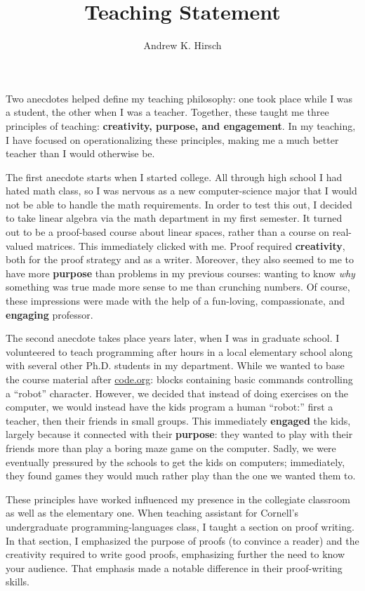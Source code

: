 \documentclass{article}
\author{Andrew K. Hirsch}
\title{Teaching Statement}
\date{}
\theoremstyle{definition}
\begin{document}
\maketitle

Two anecdotes helped define my teaching philosophy: one took place while I was a student, the other when I was a teacher.
Together, these taught me three principles of teaching: \textbf{creativity, purpose, and engagement}.
In my teaching, I have focused on operationalizing these principles, making me a much better teacher than I would otherwise be.

The first anecdote starts when I started college.
All through high school I had hated math class, so I was nervous as a new computer-science major that I would not be able to handle the math requirements.
In order to test this out, I decided to take linear algebra via the math department in my first semester.
It turned out to be a proof-based course about linear spaces, rather than a course on real-valued matrices.
This immediately clicked with me.
Proof required \textbf{creativity}, both for the proof strategy and as a writer.
Moreover, they also seemed to me to have more \textbf{purpose} than problems in my previous courses: wanting to know \emph{why} something was true made more sense to me than crunching numbers.
Of course, these impressions were made with the help of a fun-loving, compassionate, and \textbf{engaging} professor.

The second anecdote takes place years later, when I was in graduate school.
I volunteered to teach programming after hours in a local elementary school along with several other Ph.D. students in my department.
While we wanted to base the course material after \href{https://www.code.org}{code.org}: blocks containing basic commands controlling a ``robot'' character.
However, we decided that instead of doing exercises on the computer, we would instead have the kids program a human ``robot:'' first a teacher, then their friends in small groups.
This immediately \textbf{engaged} the kids, largely because it connected with their \textbf{purpose}: they wanted to play with their friends more than play a boring maze game on the computer.
Sadly, we were eventually pressured by the schools to get the kids on computers; immediately, they found games they would much rather play than the one we wanted them to.

These principles have worked influenced my presence in the collegiate classroom as well as the elementary one.
When teaching assistant for Cornell's undergraduate programming-languages class, I taught a section on proof writing.
In that section, I emphasized the purpose of proofs (to convince a reader) and the creativity required to write good proofs, emphasizing further the need to know your audience.
That emphasis made a notable difference in their proof-writing skills.
\end{document}
